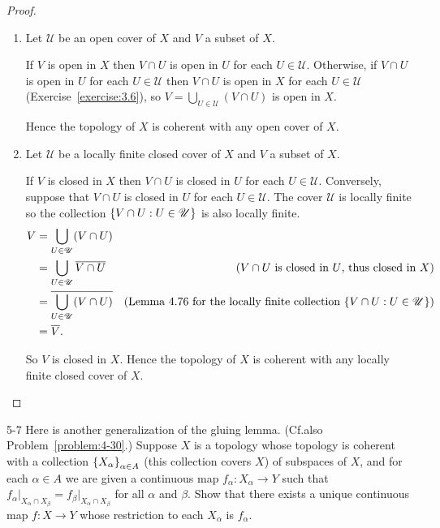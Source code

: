 \begin{proof}
	\begin{enumerate}[label={(\alph*)}]
		\item Let \( \mathscr{U} \) be an open cover of \( X \) and \( V \) a subset of \( X \).

		      If \( V \) is open in \( X \) then \( V\cap U \) is open in \( U \) for each \( U\in\mathscr{U} \). Otherwise, if \( V\cap U \) is open in \( U \) for each \( U\in\mathscr{U} \) then \( V\cap U \) is open in \( X \) for each \( U\in\mathscr{U} \) (Exercise~\ref{exercise:3.6}), so \( V = \bigcup_{U\in\mathscr{U}}(V\cap U) \) is open in \( X \).

		      Hence the topology of \( X \) is coherent with any open cover of \( X \).
		\item Let \( \mathscr{U} \) be a locally finite closed cover of \( X \) and \( V \) a subset of \( X \).

		      If \( V \) is closed in \( X \) then \( V\cap U \) is closed in \( U \) for each \( U\in\mathscr{U} \). Conversely, suppose that \( V\cap U \) is closed in \( U \) for each \( U\in\mathscr{U} \). The cover \( \mathscr{U} \) is locally finite so the collection \( \left\{{ V\cap U : U\in\mathscr{U} }\right\} \) is also locally finite.
		      \begin{align*}
			      V & = \bigcup_{U\in\mathscr{U}} (V\cap U)                                                                                                              \\
			        & = \bigcup_{U\in\mathscr{U}} \overline{V\cap U}   & \text{(\(  V\cap U  \) is closed in \(  U  \), thus closed in \(  X  \))}                       \\
			        & = \overline{\bigcup_{U\in\mathscr{U}} (V\cap U)} & \text{(Lemma 4.76 for the locally finite collection \(  \left\{{ V\cap U : U\in\mathscr{U} }\right\}  \))} \\
			        & = \overline{V}.
		      \end{align*}

		      So \( V \) is closed in \( X \). Hence the topology of \( X \) is coherent with any locally finite closed cover of \( X \).
	\end{enumerate}
\end{proof}

\begin{problem}{5-7}\label{problem:5-7}
Here is another generalization of the gluing lemma. (Cf.\@ also Problem~\ref{problem:4-30}.) Suppose \( X \) is a topology whose topology is coherent with a collection \( \left\{{X_{\alpha}}\right\}_{\alpha\in A} \) (this collection covers \( X \)) of subspaces of \( X \), and for each \( \alpha\in A \) we are given a continuous map \( f_{\alpha}: X_{\alpha} \to Y \) such that \( f_{\alpha}\vert_{X_{\alpha} \cap X_{\beta}} = f_{\beta}\vert_{X_{\alpha} \cap X_{\beta}} \) for all \( \alpha \) and \( \beta \). Show that there exists a unique continuous map \( f: X \to Y \) whose restriction to each \( X_{\alpha} \) is \( f_{\alpha} \).
\end{problem}

